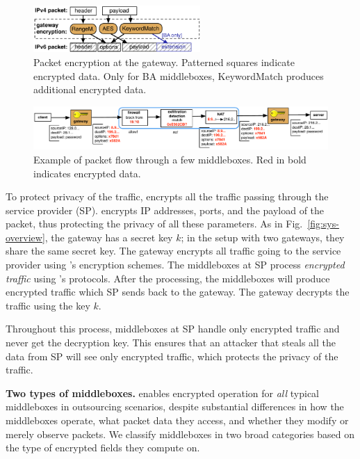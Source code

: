 \begin{figure}[t!]
\centering
  \includegraphics[width=2.5in]{fig/packet.pdf}
\caption{Packet encryption at the gateway. Patterned squares indicate encrypted data. Only for BA  middleboxes,  KeywordMatch produces additional encrypted data.  \label{fig:packet}}
\end{figure}





\begin{figure}[t!]
\centering
  \includegraphics[width=5.5in]{fig/packetpath.pdf}
\caption{Example of packet flow through a few middleboxes. Red in bold indicates encrypted data. \label{fig:packetflow}}
\end{figure}



To protect privacy of the traffic, \sys encrypts all the traffic passing through the service provider (SP).
\sys encrypts IP addresses, ports, and the payload of the packet, thus protecting the privacy of all these parameters. 
As in Fig.~\ref{fig:sys-overview}, the gateway has a secret key $k$; in the setup with two gateways, they share
the same secret key. The gateway encrypts all traffic going to the service provider using \sys's encryption schemes.
The middleboxes at SP process {\em encrypted traffic} using \sys's protocols. 
After the processing, the middleboxes
will produce encrypted traffic which SP sends back to the gateway. The gateway decrypts the traffic using the key $k$.

Throughout this process, middleboxes at SP handle only encrypted traffic and never get the decryption key. This ensures
that an attacker that steals all the data from SP will  see only encrypted traffic, which protects the privacy of the 
traffic. 

\eat
\noindent\textbf{Two types of middleboxes.} \sys enables encrypted operation for {\em all} typical middleboxes in outsourcing scenarios, despite substantial differences in how the middleboxes operate, what packet data they access, and whether they modify or merely observe packets.
  We classify middleboxes in  two broad categories based on the type of encrypted fields  they compute on.

